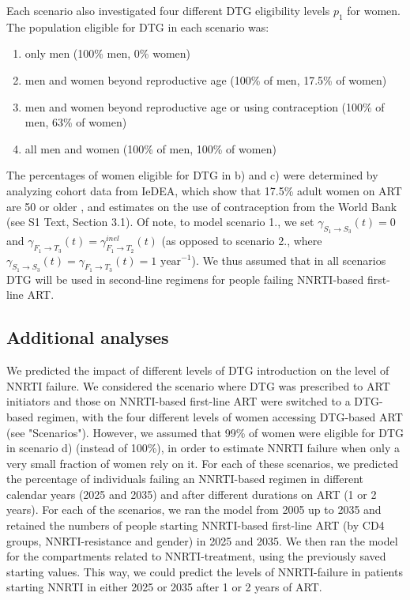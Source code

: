 \documentclass[10pt,letterpaper]{article}
\begin{document}
Each scenario also investigated four different DTG eligibility levels $p_1$ for women. The population eligible for DTG in each scenario was:
\begin{enumerate}[label=\alph*)]
\item only men (100\% men, 0\% women)
\item men and women beyond reproductive age (100\% of men, 17.5\% of women)
\item men and women beyond reproductive age or using contraception (100\% of men, 63\% of women)
\item all men and women (100\% of men, 100\% of women)
\end{enumerate}
The percentages of women eligible for DTG in b) and c) were determined by analyzing cohort data from IeDEA, which show that 17.5\% adult women on ART are 50 or older \cite{Egger2012}, and estimates on the use of contraception from the World Bank \cite{WorldBank2015}(see S1 Text, Section 3.1). Of note, to model scenario 1., we set $\gamma_{S_1\rightarrow S_3}^{}(t)=0$ and $\gamma_{F_1\rightarrow T_3}^{}(t)=\gamma_{F_1\rightarrow T_2}^{inel}(t)$ (as opposed to scenario 2., where $\gamma_{S_1\rightarrow S_3}^{}(t)=\gamma_{F_1\rightarrow T_3}^{}(t)=1\text{ year}^{-1}$). We thus assumed that in all scenarios DTG will be used in second-line regimens for people failing NNRTI-based first-line ART.

\subsection*{Additional analyses}
We predicted the impact of different levels of DTG introduction on the level of NNRTI failure. We considered the scenario where DTG was prescribed to ART initiators and those on NNRTI-based first-line ART were switched to a DTG-based regimen, with the four different levels of women accessing DTG-based ART (see "Scenarios"). However, we assumed that 99\% of women were eligible for DTG in scenario d) (instead of 100\%), in order to estimate NNRTI failure when only a very small fraction of women rely on it. For each of these scenarios, we predicted the percentage of individuals failing an NNRTI-based regimen in different calendar years (2025 and 2035) and after different durations on ART (1 or 2 years). For each of the scenarios, we ran the model from 2005 up to 2035 and retained the numbers of people starting NNRTI-based first-line ART (by CD4 groups, NNRTI-resistance and gender) in 2025 and 2035. We then ran the model for the compartments related to NNRTI-treatment, using the previously saved starting values. This way, we could predict the levels of NNRTI-failure in patients starting NNRTI in either 2025 or 2035 after 1 or 2 years of ART.
\end{document}

